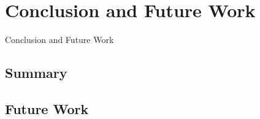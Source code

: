 \chapter{Conclusion and Future Work}
\label{Conclusion and Future Work}

Conclusion and Future Work

\section{Summary}
\section{Future Work}